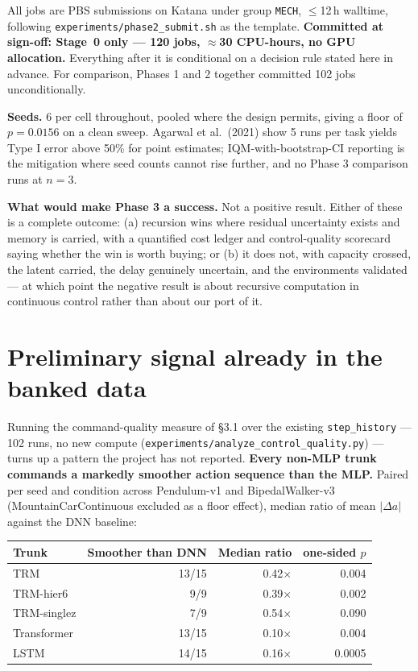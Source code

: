 \documentclass[11pt]{article}
\newcommand{\code}[1]{\texttt{\small #1}}
\begin{document}
All jobs are PBS submissions on Katana under group \code{MECH}, $\leq$12\,h walltime, following \code{experiments/phase2\_submit.sh} as the template. \textbf{Committed at sign-off: Stage~0 only --- 120 jobs, $\approx$30 CPU-hours, no GPU allocation.} Everything after it is conditional on a decision rule stated here in advance. For comparison, Phases 1 and 2 together committed 102 jobs unconditionally.

\textbf{Seeds.} 6 per cell throughout, pooled where the design permits, giving a floor of $p = 0.0156$ on a clean sweep. Agarwal et al.\ (2021) show 5 runs per task yields Type I error above 50\% for point estimates; IQM-with-bootstrap-CI reporting is the mitigation where seed counts cannot rise further, and no Phase 3 comparison runs at $n = 3$.

\textbf{What would make Phase 3 a success.} Not a positive result. Either of these is a complete outcome: (a) recursion wins where residual uncertainty exists and memory is carried, with a quantified cost ledger and control-quality scorecard saying whether the win is worth buying; or (b) it does not, with capacity crossed, the latent carried, the delay genuinely uncertain, and the environments validated --- at which point the negative result is about recursive computation in continuous control rather than about our port of it.

\section{Preliminary signal already in the banked data}

Running the command-quality measure of \S3.1 over the existing \code{step\_history} --- 102 runs, no new compute (\code{experiments/analyze\_control\_quality.py}) --- turns up a pattern the project has not reported. \textbf{Every non-MLP trunk commands a markedly smoother action sequence than the MLP.} Paired per seed and condition across Pendulum-v1 and BipedalWalker-v3 (MountainCarContinuous excluded as a floor effect), median ratio of mean $|\Delta a|$ against the DNN baseline:

\begin{center}
\begin{tabular}{@{}lrrr@{}}
\toprule
\textbf{Trunk} & \textbf{Smoother than DNN} & \textbf{Median ratio} & \textbf{one-sided $p$} \\
\midrule
TRM & 13/15 & 0.42$\times$ & 0.004 \\
TRM-hier6 & 9/9 & 0.39$\times$ & 0.002 \\
TRM-singlez & 7/9 & 0.54$\times$ & 0.090 \\
Transformer & 13/15 & 0.10$\times$ & 0.004 \\
LSTM & 14/15 & 0.16$\times$ & 0.0005 \\
\bottomrule
\end{tabular}
\end{center}
\end{document}
